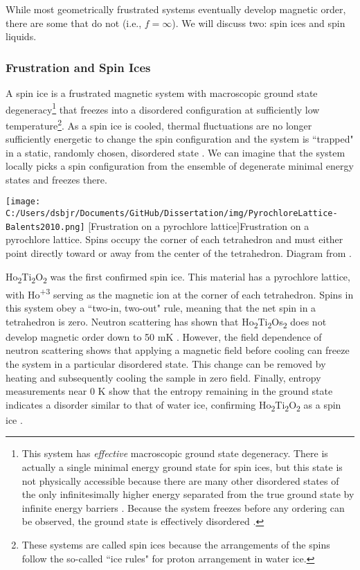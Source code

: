 While most geometrically frustrated systems eventually develop magnetic order, there are some that do not (i.e., $f = \infty$). We will discuss two: spin ices and spin liquids.

\subsubsection{Frustration and Spin Ices}

A spin ice is a frustrated magnetic system with macroscopic ground state degeneracy\footnote{This system has \textit{effective} macroscopic ground state degeneracy. There is actually a single minimal energy ground state for spin ices, but this state is not physically accessible because there are many other disordered states of the only infinitesimally higher energy separated from the true ground state by infinite energy barriers \cite{Siddharthan2001}. Because the system freezes before any ordering can be observed, the ground state is effectively disordered \cite{Castelnovo2012}.} that freezes into a disordered configuration at sufficiently low temperature\footnote{These systems are called spin ices because the arrangements of the spins follow the so-called ``ice rules" for proton arrangement in water ice.}. As a spin ice is cooled, thermal fluctuations are no longer sufficiently energetic to change the spin configuration and the system is ``trapped" in a static, randomly chosen, disordered state \cite{Bramwell2001}. We can imagine that the system locally picks a spin configuration from the ensemble of degenerate minimal energy states and freezes there.

\begin{centering}
\texttt{[image: C:/Users/dsbjr/Documents/GitHub/Dissertation/img/PyrochloreLattice-Balents2010.png]}
  \captionsetup{width=0.75\textwidth}
  [Frustration on a pyrochlore lattice]{Frustration on a pyrochlore lattice. Spins occupy the corner of each tetrahedron and must either point directly toward or away from the center of the tetrahedron. Diagram from \cite{Balents2010}.}
  \label{fig:pyrochlorelattice}
\end{centering}

Ho\textsubscript{2}Ti\textsubscript{2}O\textsubscript{2} was the first confirmed spin ice. This material has a pyrochlore lattice, with Ho\textsuperscript{+3} serving as the magnetic ion at the corner of each tetrahedron. Spins in this system obey a ``two-in, two-out" rule, meaning that the net spin in a tetrahedron is zero. Neutron scattering has shown that Ho\textsubscript{2}Ti\textsubscript{2}Os\textsubscript{2} does not develop magnetic order down to 50 mK \cite{Harris1997}. However, the field dependence of neutron scattering shows that applying a magnetic field before cooling can freeze the system in a particular disordered state. This change can be removed by heating and subsequently cooling the sample in zero field. Finally, entropy measurements near 0 K show that the entropy remaining in the ground state indicates a disorder similar to that of water ice, confirming Ho\textsubscript{2}Ti\textsubscript{2}O\textsubscript{2} as a spin ice \cite{Ramirez1999}.

